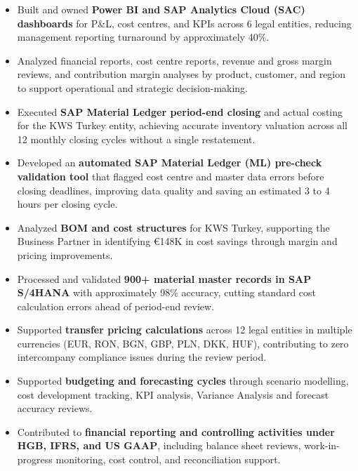 \documentclass[a4paper,10pt]{article}
\begin{document}
\begin{itemize}[itemsep=0pt, topsep=0pt, leftmargin=2em]


\item Built and owned \textbf{Power BI and SAP Analytics Cloud (SAC) dashboards} for P\&L, cost centres, and KPIs across 6 legal entities, reducing management reporting turnaround by approximately 40\%.

\item Analyzed financial reports, cost centre reports, revenue and gross margin reviews, and contribution margin analyses by product, customer, and region to support operational and strategic decision-making.

\item Executed \textbf{SAP Material Ledger period-end closing} and actual costing for the KWS Turkey entity, achieving accurate inventory valuation across all 12 monthly closing cycles without a single restatement.

\item Developed an \textbf{automated SAP Material Ledger (ML) pre-check validation tool} that flagged cost centre and master data errors before closing deadlines, improving data quality and saving an estimated 3 to 4 hours per closing cycle.

\item Analyzed \textbf{BOM and cost structures} for KWS Turkey, supporting the Business Partner in identifying €148K in cost savings through margin and pricing improvements.

\item Processed and validated \textbf{900+ material master records in SAP S/4HANA} with approximately 98\% accuracy, cutting standard cost calculation errors ahead of period-end review.

\item  Supported \textbf{transfer pricing calculations} across 12 legal entities in multiple currencies (EUR, RON, BGN, GBP, PLN, DKK, HUF), contributing to zero intercompany compliance issues during the review period.

\item Supported \textbf{budgeting and forecasting cycles} through scenario modelling, cost development tracking, KPI analysis, Variance Analysis and forecast accuracy reviews.

\item Contributed to \textbf{financial reporting and controlling activities under HGB, IFRS, and US GAAP}, including balance sheet reviews, work-in-progress monitoring, cost control, and reconciliation support.


\end{itemize}
\end{document}
